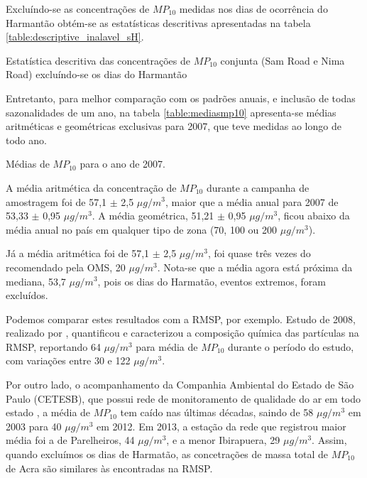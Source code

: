 Excluíndo-se as concentrações de $MP_{10}$ medidas nos dias de ocorrência do 
Harmantão obtém-se as estatísticas descritivas apresentadas na tabela 
\ref{table:descriptive_inalavel_sH}.

\begin{table}[H]
  \centering
    
  \caption{Estatística descritiva das concentrações de $MP_{10}$ conjunta 
           (Sam Road e Nima Road) excluíndo-se os dias do Harmantão
            \label{table:descriptive_inalavel_sH}}
\end{table}

Entretanto, para melhor comparação com os padrões anuais, e inclusão de todas 
sazonalidades de um ano, na tabela \ref{table:mediasmp10} apresenta-se médias 
aritméticas e geométricas exclusivas para 2007, que teve medidas ao longo de 
todo ano.

\begin{table}[H]
  \centering
  
  \caption{Médias de $MP_{10}$ para o ano de 2007. \label{table:mediasmp10}}
\end{table}

A média aritmética da concentração de $MP_{10}$ durante a campanha de amostragem 
foi de 57,1 $\pm$ 2,5 $\mu g/ m^3$, maior que a média anual para 2007 de 
53,33 $\pm$ 0,95 $\mu g/ m^3$. A média geométrica, 51,21 $\pm$ 0,95 $\mu g/ m^3$, 
ficou abaixo da média anual no país em qualquer tipo de zona 
(70, 100 ou 200 $\mu g/ m^3$). 

Já a média aritmética foi de 57,1 $\pm$ 2,5 $\mu g/ m^3$, foi quase três vezes 
do recomendado pela OMS, 20 $\mu g/m^3$. Nota-se que a média agora está próxima
da mediana, 53,7 $\mu g/ m^3$, pois os dias do Harmatão, eventos extremos, 
foram excluídos. 

Podemos comparar estes resultados com a RMSP, por exemplo. Estudo de 2008, 
realizado por \citet{souza2014}, quantificou e caracterizou a composição química
das partículas na RMSP, reportando 64 $\mu g / m^3$ para média de $MP_{10}$ 
durante o período do estudo, com variações entre 30 e 122 $\mu g / m^3$.

Por outro lado, o acompanhamento da Companhia Ambiental do Estado de São Paulo 
(CETESB), que possui rede de monitoramento de qualidade do ar em todo estado 
\citep{cetesb2014}, a média de $MP_{10}$ tem caído nas últimas décadas, saindo 
de 58 $\mu g / m^3$ em 2003 para 40 $\mu g / m^3$ em 2012. Em 2013, a estação da
rede que registrou maior média foi a de Parelheiros, 44 $\mu g / m^3$, e a menor 
Ibirapuera, 29 $\mu g / m^3$. Assim, quando excluímos os dias de Harmatão, 
as concetrações de massa total de $MP_{10}$ de Acra são similares às encontradas
na RMSP.

